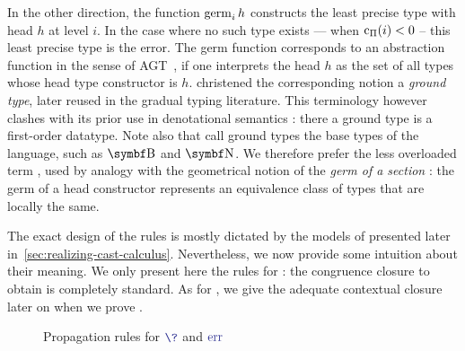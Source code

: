 In the other direction, the  function $\mathop{\operatorname{germ}_{i}} h$ constructs the least
precise type with head $h$ at level $i$.
In the case where no such type exists — \eg when $\mathop{\mathrm{c}_\Pi}(i) < 0$ –
this least precise type is the error.
The germ function corresponds to an abstraction function in the sense of
AGT~, if one interprets the head $h$
as the set of all types whose head type constructor is $h$.
 christened the corresponding notion a
\emph{ground type}, later reused in the gradual typing literature.
This terminology however clashes with its prior use in denotational semantics
: there a ground type is a first-order datatype.
Note also that 
call ground types the base types of the 
language, such as $\Bool$ and $\Nat$.
We therefore prefer the less overloaded term , used by analogy with the
geometrical notion of the \emph{germ of a section}
: the germ of a head constructor represents an
equivalence class of types that are locally the same.

The exact design of the  rules is mostly dictated by
the models of  presented later in~\cref{sec:realizing-cast-calculus}.
Nevertheless, we now provide some intuition about their meaning. We only present here the
rules for %
: the congruence closure to obtain 
is completely standard. As for , we give the adequate
contextual closure later on when we prove .

\begin{figure*}[ht]
\ContinuedFloat*
{}
\caption{Propagation rules for $\tcol{\?}$ and $\tcol{\err}$}
\label{fig:ccic-red-propag}
\end{figure*}

